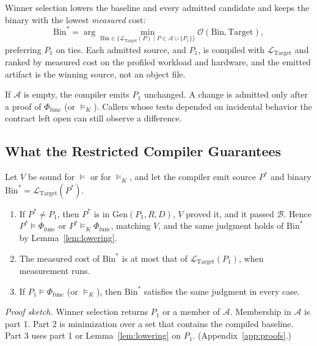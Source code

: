 Winner selection lowers the baseline and every admitted candidate and keeps
the binary with the lowest \emph{measured} cost:
\begin{equation}
\label{eq:winner}
\mathrm{Bin}^* = \arg\min_{\mathrm{Bin} \in \{\mathcal{L}_{\text{Target}}(P)
\mid P \in \mathcal{A} \cup \{P_1\}\}}
\mathcal{O}(\mathrm{Bin}, \text{Target}),
\end{equation}
preferring \(P_1\) on ties. Each admitted source, and \(P_1\), is compiled
with \(\mathcal{L}_{\text{Target}}\) and ranked by measured cost on the
profiled workload and hardware, and the emitted artifact is the winning
source, not an object file.

If \(\mathcal{A}\) is empty, the compiler emits \(P_1\) unchanged. A change
is admitted only after a proof of \(\Phi_{\text{func}}\) (or \(\models_K\)).
Callers whose tests depended on incidental behavior the contract left open
can still observe a difference.

\subsection{What the Restricted Compiler Guarantees}
\label{sec:restricted_thm}

\begin{theorem}
\label{thm:restricted}
Let \(V\) be sound for \(\models\) or for \(\models_K\), and let the compiler
emit source \(P^*\) and binary
\(\mathrm{Bin}^* = \mathcal{L}_{\text{Target}}(P^*)\).
\begin{enumerate}
  \item If \(P^* \neq P_1\), then \(P^*\) is in \(\mathrm{Gen}(P_1, R, D)\),
  \(V\) proved it, and it passed \(\mathcal{B}\). Hence
  \(P^* \models \Phi_{\text{func}}\) or \(P^* \models_K \Phi_{\text{func}}\),
  matching \(V\), and the same judgment holds of \(\mathrm{Bin}^*\) by
  Lemma~\ref{lem:lowering}.
  \item The measured cost of \(\mathrm{Bin}^*\) is at most that of
  \(\mathcal{L}_{\text{Target}}(P_1)\), when measurement runs.
  \item If \(P_1 \models \Phi_{\text{func}}\) (or \(\models_K\)), then
  \(\mathrm{Bin}^*\) satisfies the same judgment in every case.
\end{enumerate}
\end{theorem}

\noindent\emph{Proof sketch.} Winner selection returns \(P_1\) or a member
of \(\mathcal{A}\). Membership in \(\mathcal{A}\) is part 1. Part 2 is
minimization over a set that contains the compiled baseline. Part 3 uses
part 1 or Lemma~\ref{lem:lowering} on \(P_1\).
(Appendix~\ref{app:proofs}.)

